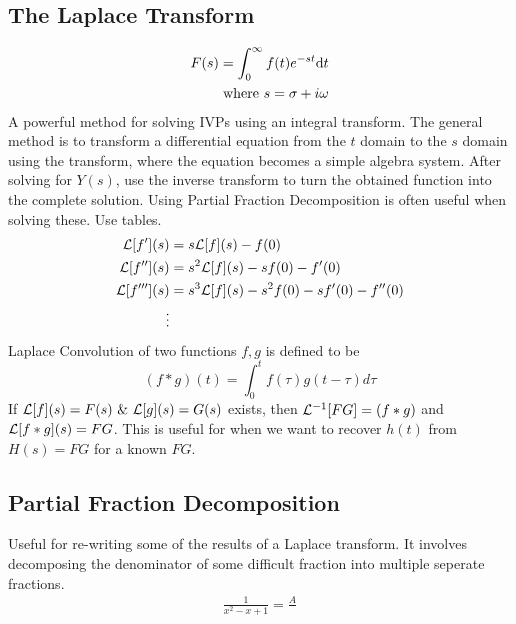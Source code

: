 \subsection{The Laplace Transform}
    \begin{align*}
        F(s) =\int_0^\infty f(t) e^{-st} {\rm d} t \\ \text{ where } s = \sigma + i\omega
    \end{align*}
    A powerful method for solving IVPs using an integral transform. The general method is to transform a differential equation from the $t$ domain to the $s$ domain using the transform, where the equation becomes a simple algebra system. After solving for $Y(s)$, use the inverse transform to turn the obtained function into the complete solution.  Using Partial Fraction Decomposition is often useful when solving these. Use tables.
    \begin{align*}
        \mathcal{L}[f'](s)&=s\mathcal{L}[f](s)-f(0)
        \\
        \mathcal{L}[f''](s)&=s^2\mathcal{L}[f](s)-sf(0)-f'(0)
        \\
        \mathcal{L}[f'''](s)&=s^3\mathcal{L}[f](s)-s^2f(0)-sf'(0)-f''(0)
        \\
        \vdots
    \end{align*}
    Laplace Convolution of two functions $f,g$ is defined to be 
    \[
    (f*g)(t)=\int_0^tf(\tau)g(t-\tau)d\tau
    \]
    If $\mathcal{L}[f](s)=F(s)~\&~\mathcal{L}[g](s)=G(s)$ exists, then $\mathcal{L}^{-1}[FG]=(f*g)$ and $\mathcal{L}[f*g](s)=FG$. This is useful for when we want to recover $h(t)$ from $H(s)=FG$ for a known $FG$.
\subsection{Partial Fraction Decomposition}
    Useful for re-writing some of the results of a Laplace transform. It involves decomposing the denominator of some difficult fraction into multiple seperate fractions. 
    \begin{align*}
        \frac{1}{x^2-x+1}=\frac{A}{}
    \end{align*}
\newpage

